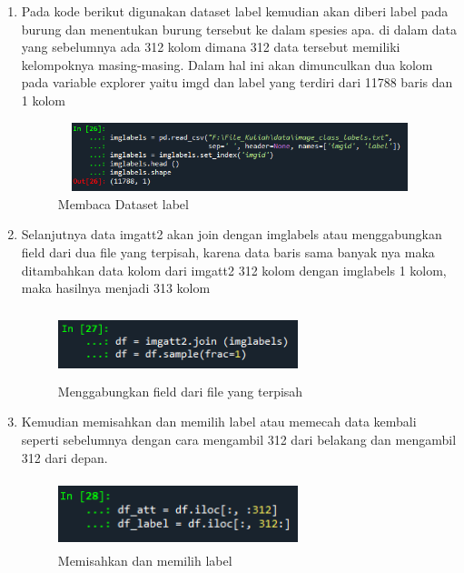 \begin{enumerate}
    \item Pada kode berikut digunakan dataset label kemudian akan diberi label pada burung dan menentukan burung tersebut ke dalam spesies apa. di dalam data yang sebelumnya ada 312 kolom dimana 312 data tersebut memiliki kelompoknya masing-masing. Dalam hal ini akan dimunculkan dua kolom pada variable explorer yaitu imgd dan label yang terdiri dari 11788 baris dan 1 kolom
    \begin{figure}[!htbp]
        \centering
        \includegraphics[width=12cm,height=2cm]{figures/label_rf.png}
        \caption{Membaca Dataset label}
        \label{penanda}
    \end{figure}

    \item Selanjutnya data imgatt2 akan join dengan imglabels atau menggabungkan field dari dua file yang terpisah, karena data baris sama banyak nya maka ditambahkan data kolom dari imgatt2 312 kolom dengan imglabels 1 kolom, maka hasilnya menjadi 313 kolom
    \begin{figure}[!htbp]
        \centering
        \includegraphics[width=7cm,height=2cm]{figures/join_rf.png}
        \caption{Menggabungkan field dari file yang terpisah}
        \label{penanda}
    \end{figure}

    \item Kemudian memisahkan dan memilih label atau memecah data kembali seperti sebelumnya dengan cara mengambil 312 dari belakang dan mengambil 312 dari depan.
    \begin{figure}[!htbp]
        \centering
        \includegraphics[width=7cm,height=2cm]{figures/df_att_label.png}
        \caption{Memisahkan dan memilih label}
        \label{penanda}
    \end{figure}


\end{enumerate}
